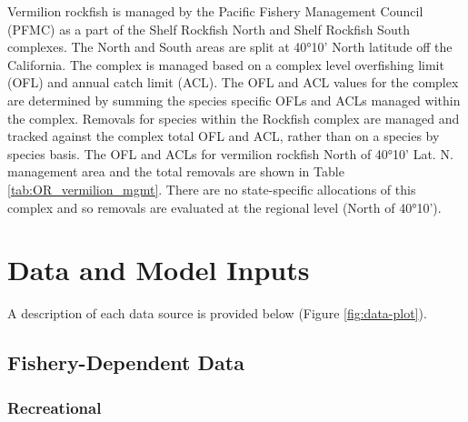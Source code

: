 \documentclass[11pt,
  english,
  a4paper,
]{article}
\begin{document}
\leavevmode\tagmcend\tagstructend


Vermilion rockfish is managed by the Pacific Fishery Management Council (PFMC) as a part of the Shelf Rockfish North and Shelf Rockfish South complexes. The North and South areas are split at 40°10' North latitude off the California. The complex is managed based on a complex level overfishing limit (OFL) and annual catch limit (ACL). The OFL and ACL values for the complex are determined by summing the species specific OFLs and ACLs managed within the complex. Removals for species within the Rockfish complex are managed and tracked against the complex total OFL and ACL, rather than on a species by species basis. The OFL and ACLs for vermilion rockfish North of 40°10' Lat. N. management area and the total removals are shown in Table \ref{tab:OR_vermilion_mgmt}. There are no state-specific allocations of this complex and so removals are evaluated at the regional level (North of 40°10').

\leavevmode\tagmcend\tagstructend\par


\hypertarget{data-and-model-inputs}{%
\section{Data and Model Inputs}\label{data-and-model-inputs}}

\leavevmode\tagmcend\tagstructend


A description of each data source is provided below (Figure \ref{fig:data-plot}).

\leavevmode\tagmcend\tagstructend\par


\hypertarget{fishery-dependent-data}{%
\subsection{Fishery-Dependent Data}\label{fishery-dependent-data}}

\leavevmode\tagmcend\tagstructend


\hypertarget{recreational}{%
\subsubsection{Recreational}\label{recreational}}
\end{document}
